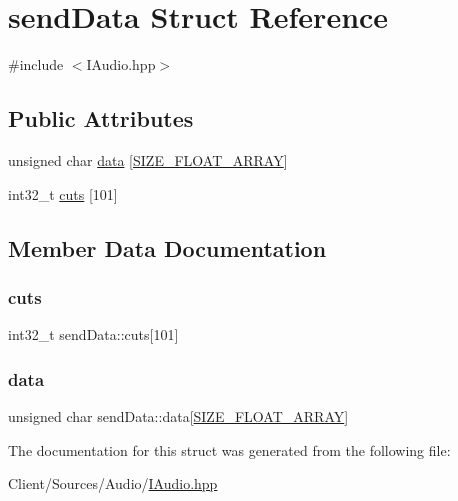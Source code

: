 \hypertarget{structsendData}{}\section{send\+Data Struct Reference}
\label{structsendData}


{\ttfamily \#include $<$I\+Audio.\+hpp$>$}

\subsection*{Public Attributes}
\begin{DoxyCompactItemize}
\item 
unsigned char \hyperlink{structsendData_ab5c04c85a208c0dd471f8cb76954561d}{data} \mbox{[}\hyperlink{IAudio_8hpp_a7b18daf241cd649f29e47ba8e42dea03}{S\+I\+Z\+E\+\_\+\+F\+L\+O\+A\+T\+\_\+\+A\+R\+R\+AY}\mbox{]}
\item 
int32\+\_\+t \hyperlink{structsendData_a117e7917868c9481904cbc346b2ac592}{cuts} \mbox{[}101\mbox{]}
\end{DoxyCompactItemize}


\subsection{Member Data Documentation}
\mbox{\label{structsendData_a117e7917868c9481904cbc346b2ac592}} 
\subsubsection{\texorpdfstring{cuts}{cuts}}
{\footnotesize\ttfamily int32\+\_\+t send\+Data\+::cuts\mbox{[}101\mbox{]}}

\mbox{\label{structsendData_ab5c04c85a208c0dd471f8cb76954561d}} 
\subsubsection{\texorpdfstring{data}{data}}
{\footnotesize\ttfamily unsigned char send\+Data\+::data\mbox{[}\hyperlink{IAudio_8hpp_a7b18daf241cd649f29e47ba8e42dea03}{S\+I\+Z\+E\+\_\+\+F\+L\+O\+A\+T\+\_\+\+A\+R\+R\+AY}\mbox{]}}



The documentation for this struct was generated from the following file\+:\begin{DoxyCompactItemize}
\item 
Client/\+Sources/\+Audio/\hyperlink{IAudio_8hpp}{I\+Audio.\+hpp}\end{DoxyCompactItemize}
